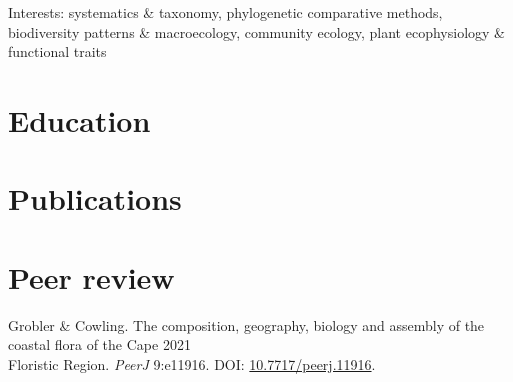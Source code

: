 \documentclass[10pt]{article}
\begin{document}


\bigskip

Interests:
  systematics \& taxonomy,
  phylogenetic comparative methods,
  biodiversity patterns \& macroecology,
  community ecology,
  plant ecophysiology \& functional traits





\hrulefill

\section*{Education} %



\bigskip

\section*{Publications} %



\bigskip

\section*{Peer review} %

Grobler \& Cowling. The composition, geography, biology and assembly of the
  coastal flora of the Cape                                       \hfill 2021 \\
  \hspace{2em} Floristic Region. \textit{PeerJ} 9:e11916. DOI:
    \href{https://doi.org/10.7717/peerj.11916}{10.7717/peerj.11916}.
\end{document}

